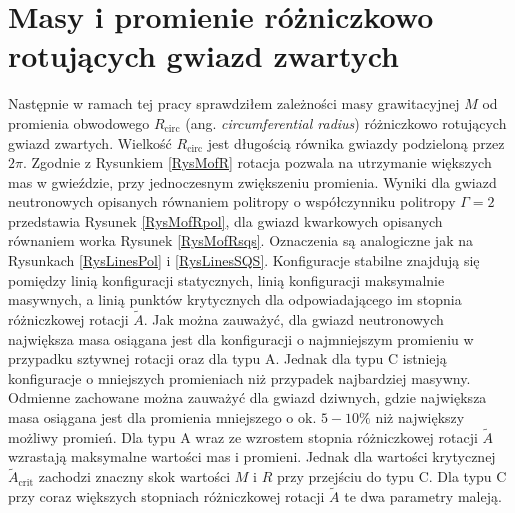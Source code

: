 \documentclass{bachelor_thesis}
\begin{document}
            \section{Masy i promienie różniczkowo rotujących gwiazd zwartych}
            Następnie w ramach tej pracy sprawdziłem zależności masy grawitacyjnej $M$ od promienia obwodowego $R_\textrm{circ}$ (ang. \textit{circumferential radius}) różniczkowo rotujących gwiazd zwartych. Wielkość $R_\textrm{circ}$ jest długością równika gwiazdy podzieloną przez $2\pi$. Zgodnie z Rysunkiem \ref{RysMofR} rotacja pozwala na utrzymanie większych mas w gwieździe, przy jednoczesnym zwiększeniu promienia. Wyniki dla gwiazd neutronowych opisanych równaniem politropy o współczynniku politropy $\Gamma=2$ przedstawia Rysunek \ref{RysMofRpol}, dla gwiazd kwarkowych opisanych równaniem worka Rysunek \ref{RysMofRsqs}. Oznaczenia są analogiczne jak na Rysunkach \ref{RysLinesPol} i \ref{RysLinesSQS}. Konfiguracje stabilne znajdują się pomiędzy linią konfiguracji statycznych, linią konfiguracji maksymalnie masywnych, a linią punktów krytycznych dla odpowiadającego im stopnia różniczkowej rotacji $\tilde{A}$. Jak można zauważyć, dla gwiazd neutronowych największa masa osiągana jest dla konfiguracji o najmniejszym promieniu w przypadku sztywnej rotacji oraz dla typu A. Jednak dla typu C istnieją konfiguracje o mniejszych promieniach niż przypadek najbardziej masywny. Odmienne zachowane można zauważyć dla gwiazd dziwnych, gdzie największa masa osiągana jest dla promienia mniejszego o ok. $5-10 \%$ niż największy możliwy promień. Dla typu A wraz ze wzrostem stopnia różniczkowej rotacji $\tilde{A}$ wzrastają maksymalne wartości mas i promieni. Jednak dla wartości krytycznej $\tilde{A}_\textrm{crit}$ zachodzi znaczny skok wartości $M$ i $R$ przy przejściu do typu C. Dla typu C przy coraz większych stopniach różniczkowej rotacji $\tilde{A}$ te dwa parametry maleją.
\end{document}
